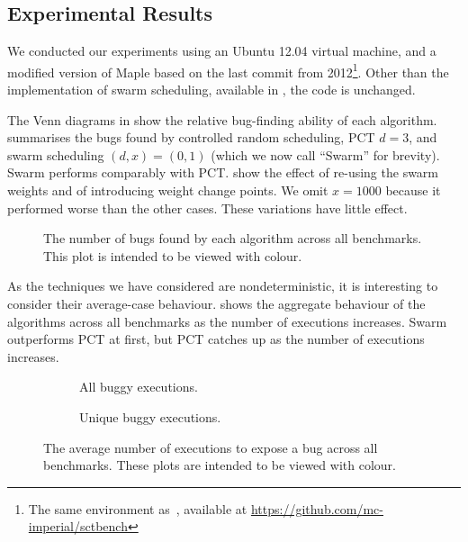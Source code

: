 \subsection{Experimental Results}
\label{sec:algorithms-bench-results}

We conducted our experiments using an Ubuntu 12.04 virtual machine,
and a modified version of Maple based on the last commit from
2012\footnote{The same environment as~\cite{thomson2016}, available at
  \url{https://github.com/mc-imperial/sctbench}}.  Other than the
implementation of swarm scheduling, available in , the
code is unchanged.

The Venn diagrams in  show the relative bug-finding ability of
each algorithm.   summarises the bugs found by controlled
random scheduling, PCT $d=3$, and swarm scheduling $(d,x)=(0,1)$ (which we now
call ``Swarm'' for brevity).  Swarm performs comparably
with PCT.   show the effect of re-using
the swarm weights and of introducing weight change points.  We omit $x=1000$
because it performed worse than the other cases.  These variations
have little effect.

\begin{figure}
  \centering
  
  \caption[Plot of bugs found by each scheduling algorithm.]{The number of bugs found by each algorithm across all benchmarks.  This plot is intended to be viewed with colour.}\label{fig:totalbugs}
\end{figure}

As the techniques we have considered are nondeterministic, it is
interesting to consider their average-case behaviour.
 shows the aggregate behaviour of the algorithms
across all benchmarks as the number of executions increases.  Swarm
outperforms PCT at first, but PCT catches up as the number of
executions increases.

\begin{figure}
  \centering
  \begin{subfigure}{0.49\textwidth}
    \centering
    \resizebox{\textwidth}{!}{}
    \caption{All buggy executions.}\label{fig:freqbugs-total}
  \end{subfigure}
  \begin{subfigure}{0.49\textwidth}
    \centering
    \resizebox{\textwidth}{!}{}
    \caption{Unique buggy executions.}\label{fig:freqbugs-unique}
  \end{subfigure}
  \caption[Plot of average number of executions needed to expose a bug.]{The average number of executions to expose a bug across all benchmarks.  These plots are intended to be viewed with colour.}\label{fig:freqbugs}
\end{figure}

